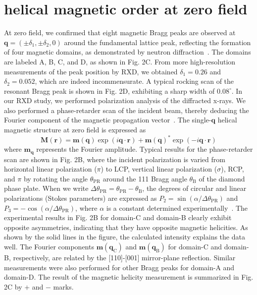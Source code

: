 \documentclass[aps,prb,reprint,superscriptaddress,amsmath,amssymb]{revtex4-2}
\begin{document}
\section{helical magnetic order at zero field}
At zero field, we confirmed that eight magnetic Bragg peaks are observed at $\bm{q}=(\pm \delta_1, \pm \delta_2, 0)$ around the fundamental lattice peak, reflecting the formation of four magnetic domains, as demonstrated by neutron diffraction~\cite{Fabreges16}.  
The domains are labeled A, B, C, and D, as shown in Fig. 2C. 
From more high-resolution measurements of the peak position by RXD, we obtained $\delta_1=0.26$ and $\delta_2=0.052$, which are indeed incommensurate. A typical rocking scan of the resonant Bragg peak is shown in Fig. 2D, exhibiting a sharp width of $0.08^{\circ}$. 
In our RXD study, we performed polarization analysis of the diffracted x-rays. We also performed a phase-retarder scan of the incident beam, thereby deducing the Fourier component of the magnetic propagation vector~\cite{SM}. 
The single-$\bm{q}$ helical magnetic structure at zero field is expressed as
\begin{equation}
\bm{M}(\bm{r}) = \bm{m}(\bm{q}) \exp (i\bm{q}\cdot \bm{r}) + \bm{m}(\bm{q})^{*} \exp (-i\bm{q} \cdot \bm{r}) 
\label{eq:1}
\end{equation}
where $\bm{m}_{\bm{q}}$ represents the Fourier amplitude. 
Typical results for the phase-retarder scan are shown in Fig. 2B, where the incident polarization is varied from horizontal linear polarization ($\pi$) to LCP, vertical linear polarization ($\sigma$), RCP, and $\pi$ by rotating the angle $\theta_{\text{PR}}$ around the 111 Bragg angle $\theta_{\text{B}}$ of the diamond phase plate. When we write $\Delta\theta_{\text{PR}}= \theta_{\text{PR}} - \theta_{\text{B}}$, 
the degrees of circular and linear polarizations (Stokes parameters) are expressed as $P_2=\sin (\alpha/\Delta\theta_{\text{PR}})$ and $P_3=-\cos (\alpha/\Delta\theta_{\text{PR}})$, where $\alpha$ is a constant determined experimentally~\cite{SM}.  
The experimental results in Fig. 2B for domain-C and domain-B clearly exhibit opposite asymmetries, indicating that they have opposite magnetic helicities. As shown by the solid lines in the figure, the calculated intensity explains the data well. 
The Fourier components $\bm{m}(\bm{q}_{\text{C}})$ and $\bm{m}(\bm{q}_{\text{B}})$ for domain-C and domain-B, respectively, are related by the [110]-[001] mirror-plane reflection. 
Similar measurements were also performed for other Bragg peaks for domain-A and domain-D. The result of the magnetic helicity measurement is summarized in Fig. 2C by $+$ and $-$ marks. 
\end{document}
